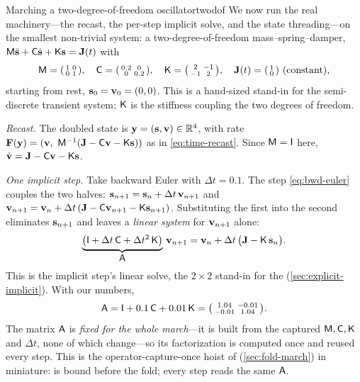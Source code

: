 \begin{workedexample}{Marching a two-degree-of-freedom oscillator}{twodof}
We now run the real machinery---the recast, the per-step implicit solve, and the
state threading---on the smallest non-trivial system: a two-degree-of-freedom
mass--spring--damper, $\mathsf{M}\ddot{\mathbf{s}} + \mathsf{C}\dot{\mathbf{s}} + \mathsf{K}\mathbf{s} = \mathbf{J}(t)$ with
\[
  \Mop = \begin{psmallmatrix}1 & 0\\ 0 & 1\end{psmallmatrix},\quad
  \Cop = \begin{psmallmatrix}0.2 & 0\\ 0 & 0.2\end{psmallmatrix},\quad
  \Kop = \begin{psmallmatrix}2 & -1\\ -1 & 2\end{psmallmatrix},\quad
  \vJ(t) = \begin{psmallmatrix}1\\ 0\end{psmallmatrix}\ (\text{constant}),
\]
starting from rest, $\mathbf{s}_0 = \mathbf{v}_0 = (0,0)$. This is a hand-sized stand-in for the
semi-discrete transient system; $\mathsf{K}$ is the stiffness coupling the two degrees of
freedom.

\medskip
\emph{Recast.} The doubled state is $\mathbf{y} = (\mathbf{s}, \mathbf{v}) \in \mathbb R^4$, with rate
$\mathbf{F}(\mathbf{y}) = (\mathbf{v},\ \mathsf{M}^{-1}(\mathbf{J} - \mathsf{C}\mathbf{v} - \mathsf{K}\mathbf{s}))$ as in
\cref{eq:time-recast}. Since $\mathsf{M} = \mathsf{I}$ here, $\dot{\mathbf{v}} = \mathbf{J} - \mathsf{C}\mathbf{v} -
\mathsf{K}\mathbf{s}$.

\medskip
\emph{One implicit step.} Take backward Euler with $\Delta t = 0.1$. The step
\cref{eq:bwd-euler} couples the two halves: $\mathbf{s}_{n+1} = \mathbf{s}_n + \Delta t\,\mathbf{v}_{n+1}$
and $\mathbf{v}_{n+1} = \mathbf{v}_n + \Delta t\,(\mathbf{J} - \mathsf{C}\mathbf{v}_{n+1} - \mathsf{K}\mathbf{s}_{n+1})$.
Substituting the first into the second eliminates $\mathbf{s}_{n+1}$ and leaves a
\emph{linear system} for $\mathbf{v}_{n+1}$ alone:
\[
  \underbrace{\bigl(\mathsf{I} + \Delta t\,\mathsf{C} + \Delta t^2\,\mathsf{K}\bigr)}_{\displaystyle \mathsf{A}}
  \,\mathbf{v}_{n+1}
  = \mathbf{v}_n + \Delta t\,\bigl(\mathbf{J} - \mathsf{K}\,\mathbf{s}_n\bigr).
\]
This is the implicit step's linear solve, the $2\times 2$ stand-in for the
 (\cref{sec:explicit-implicit}). With our numbers,
\[
  \mathsf{A} = \mathsf{I} + 0.1\,\mathsf{C} + 0.01\,\mathsf{K}
  = \begin{psmallmatrix}1.04 & -0.01\\ -0.01 & 1.04\end{psmallmatrix}.
\]
The matrix $\mathsf{A}$ is \emph{fixed for the whole march}---it is built from the
captured $\mathsf{M},\mathsf{C},\mathsf{K}$ and $\Delta t$, none of which change---so its
factorization is computed once and reused every step. This is the
operator-capture-once hoist of  (\cref{sec:fold-march}) in
miniature:  is bound before the fold; every step reads the same $\mathsf{A}$.


\end{workedexample}
